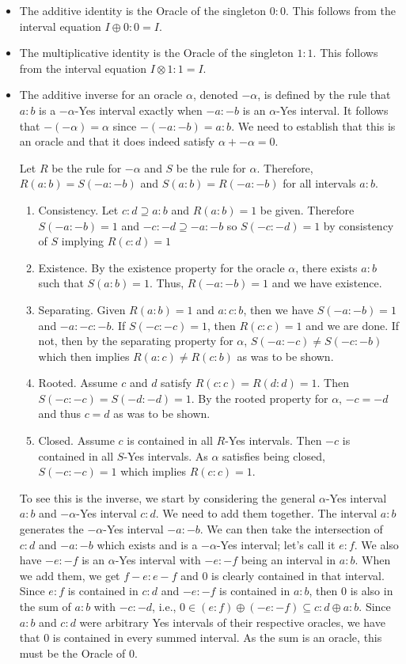 \documentclass[12pt]{article}
\begin{document}
\begin{itemize}
    \item The additive identity is the Oracle of the singleton $0:0$. This follows from the interval equation $I \oplus 0:0 = I$.
    \item The multiplicative identity is the Oracle of the singleton $1:1$. This follows from the interval equation $I \otimes 1:1 = I$.
    \item The additive inverse for an oracle $\alpha$, denoted $-\alpha$, is defined by the rule that $a:b$ is a $-\alpha$-Yes interval exactly when $-a:-b$ is an $\alpha$-Yes interval.  It follows that $-(-\alpha) = \alpha$ since $-(-a:-b) = a:b$. We need to establish that this is an oracle and that it does indeed satisfy $\alpha + -\alpha = 0$. 
    
    Let $R$ be the rule for $-\alpha$ and $S$ be the rule for $\alpha$. Therefore, $R(a:b)=S(-a:-b)$ and $S(a:b) = R(-a:-b)$ for all intervals $a:b$.
    
    \begin{enumerate}
        \item Consistency. Let $c:d \supseteq a:b$ and $R(a:b)=1$ be given. Therefore $S(-a:-b) = 1$ and $-c:-d \supseteq -a:-b$ so $S(-c:-d)=1$ by consistency of $S$ implying $R(c:d) = 1$
        \item Existence. By the existence property for the oracle $\alpha$, there exists $a:b$ such that $S(a:b)=1$. Thus, $R(-a:-b)=1$ and we have existence. 
        \item Separating. Given $R(a:b)=1$ and $a:c:b$, then we have $S(-a:-b)=1$ and $-a:-c:-b$. If $S(-c:-c)=1$, then $R(c:c)=1$ and we are done. If not, then by the separating property for $\alpha$, $S(-a:-c) \neq S(-c:-b)$ which then implies $R(a:c)\neq R(c:b)$ as was to be shown. 
        \item Rooted. Assume $c$ and $d$ satisfy $R(c:c)=R(d:d)=1$. Then $S(-c:-c)=S(-d:-d)=1$. By the rooted property for $\alpha$, $-c = -d$ and thus $c=d$ as was to be shown. 
        \item Closed. Assume $c$ is contained in all $R$-Yes intervals. Then $-c$ is contained in all $S$-Yes intervals. As $\alpha$ satisfies being closed, $S(-c:-c)=1$ which implies $R(c:c)=1$.
    \end{enumerate}
    
    To see this is the inverse, we start by considering the general $\alpha$-Yes interval $a:b$ and $-\alpha$-Yes interval $c:d$. We need to add them together. The interval $a:b$ generates the $-\alpha$-Yes interval $-a:-b$. We can then take the intersection of $c:d$ and $-a:-b$ which exists and is a $-\alpha$-Yes interval; let's call it $e:f$. We also have $-e:-f$ is an $\alpha$-Yes interval with $-e:-f$ being an interval in $a:b$. When we add them, we get $f-e:e-f$ and $0$ is clearly contained in that interval. Since $e:f$ is contained in $c:d$ and $-e:-f$ is contained in $a:b$, then $0$ is also in the sum of $a:b$ with $-c:-d$, i.e.,  $0 \in (e:f) \oplus (-e:-f) \subseteq c:d \oplus a:b$. Since $a:b$ and $c:d$ were arbitrary Yes intervals of their respective oracles, we have that 0 is contained in every summed interval. As the sum is an oracle, this must be the Oracle of $0$.
    

\end{itemize}
\end{document}
